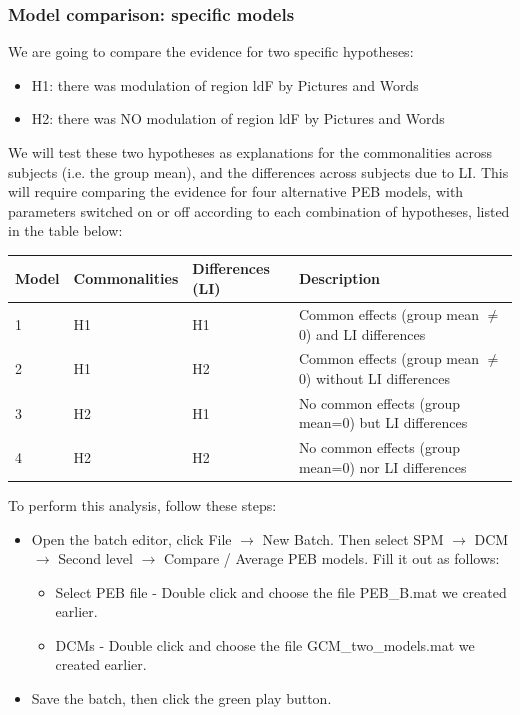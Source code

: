 \documentclass{article}
\begin{document}
\subsubsection{Model comparison: specific models} \label{GUI_specificDCMs}

We are going to compare the evidence for two specific hypotheses:

\begin{itemize}
    \item H1: there was modulation of region ldF by Pictures and Words
    \item H2: there was NO modulation of region ldF by Pictures and Words
\end{itemize}

We will test these two hypotheses as explanations for the commonalities across subjects (i.e. the group mean), and the differences across subjects due to LI. This will require comparing the evidence for four alternative PEB models, with parameters switched on or off according to each combination of hypotheses, listed in the table below: 

\begin{table}[h]
\begin{tabular}{|l|l|l|p{6cm}|}
\hline \textbf{Model}
 & \textbf{Commonalities} & \textbf{Differences (LI)} & \textbf{Description}                             \\ \hline
1              & H1                     & H1          & Common effects (group mean $\ne$ 0) and LI differences                                   \\ \hline
2              & H1                     & H2          & Common effects (group mean $\ne$ 0) without LI differences \\ \hline
3              & H2                     & H1          & No common effects (group mean=0) but LI differences        \\ \hline
4              & H2                     & H2          & No common effects (group mean=0) nor LI differences         \\ \hline
\end{tabular}
\end{table}

To perform this analysis, follow these steps:

\begin{itemize}
    \item Open the batch editor, click File $\rightarrow$ New Batch. Then select SPM $\rightarrow$ DCM $\rightarrow$ Second level $\rightarrow$ Compare / Average PEB models. Fill it out as follows:
    \begin{itemize}
        \item Select PEB file - Double click and choose the file PEB\_B.mat we created earlier.
        \item DCMs - Double click and choose the file GCM\_two\_models.mat we created earlier.
    \end{itemize}
    \item Save the batch, then click the green play button.
\end{itemize}
\end{document}
